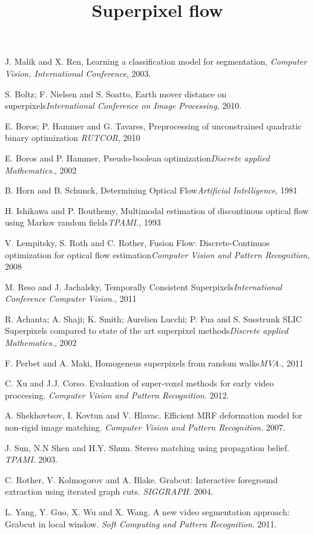 \documentclass{bmvc2k}
\title{Superpixel flow}
\begin{document}
\maketitle





\begin{thebibliography}{99}

J. Malik and X. Ren, Learning a classification model for segmentation, {\it Computer Vision, International Conference}, 2003.

S. Boltz; F. Nielsen and S. Soatto, Earth mover distance on superpixels{\it International Conference on Image Processing}, 2010.

E. Boros; P. Hammer and G. Tavares, Preprocessing of unconstrained quadratic binary optimization {\it RUTCOR}, 2010

E. Boros and P. Hammer, Pseudo-boolean optimization{\it Discrete applied Mathematics.}, 2002

B. Horn and B. Schunck, Determining Optical Flow{\it Artificial Intelligence}, 1981

H. Ishikawa and P. Bouthemy, Multimodal estimation of discontinous optical flow using Markov random fields{\it TPAMI.}, 1993

V. Lempitsky, S. Roth and C. Rother, Fusion Flow: Discrete-Continuos optimization for optical flow estimation{\it Computer Vision and Pattern Recognition}, 2008

M. Reso and J. Jachalsky, Temporally Consistent Superpixels{\it International Conference Computer Vision.}, 2011

R. Achanta; A. Shaji; K. Smith; Aurelien Lucchi; P. Fua and S. Susstrunk SLIC Superpixels compared to state of the art superpixel methods{\it Discrete applied Mathematics.}, 2002

F. Perbet and A. Maki, Homogeneus superpixels from random walks{\it MVA.}, 2011

C. Xu and J.J. Corso. Evaluation of super-voxel methods for early video proccesing. {\it Computer Vision and Pattern Recognition}. 2012.

A. Shekhovtsov, I. Kovtun and V. Hlavac. Efficient MRF deformation model for non-rigid image matching. {\it Computer Vision and Pattern Recognition}. 2007.

J. Sun, N.N Shen and H.Y. Shum. Stereo matching using propagation belief. {\it TPAMI}. 2003.

C. Rother, V. Kolmogorov and A. Blake. Grabcut: Interactive foreground extraction using iterated graph cuts. {\it SIGGRAPH}. 2004.

L. Yang, Y. Guo, X. Wu and X. Wang. A new video segmentation approach: Grabcut in local window. {\it Soft Computing and Pattern Recognition}. 2011.

\end{thebibliography}
\end{document}
